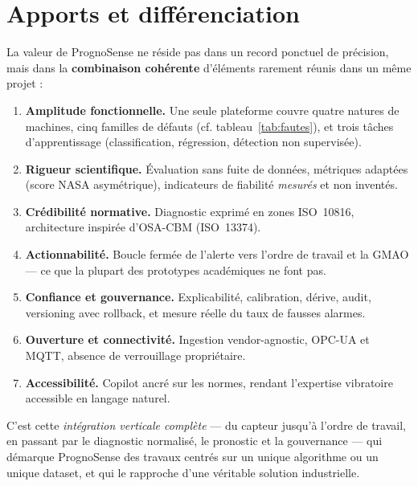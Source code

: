 \section{Apports et différenciation}
La valeur de PrognoSense ne réside pas dans un record ponctuel de précision, mais dans la
\textbf{combinaison cohérente} d'éléments rarement réunis dans un même projet :
\begin{enumerate}[leftmargin=1.6em]
  \item \textbf{Amplitude fonctionnelle.} Une seule plateforme couvre quatre natures de
        machines, cinq familles de défauts (cf. tableau~\ref{tab:fautes}), et trois tâches
        d'apprentissage (classification, régression, détection non supervisée).
  \item \textbf{Rigueur scientifique.} Évaluation sans fuite de données, métriques adaptées
        (score NASA asymétrique), indicateurs de fiabilité \emph{mesurés} et non inventés.
  \item \textbf{Crédibilité normative.} Diagnostic exprimé en zones ISO~10816, architecture
        inspirée d'OSA-CBM (ISO~13374).
  \item \textbf{Actionnabilité.} Boucle fermée de l'alerte vers l'ordre de travail et la
        GMAO --- ce que la plupart des prototypes académiques ne font pas.
  \item \textbf{Confiance et gouvernance.} Explicabilité, calibration, dérive, audit,
        versioning avec rollback, et mesure réelle du taux de fausses alarmes.
  \item \textbf{Ouverture et connectivité.} Ingestion vendor-agnostic, OPC-UA et MQTT,
        absence de verrouillage propriétaire.
  \item \textbf{Accessibilité.} Copilot ancré sur les normes, rendant l'expertise vibratoire
        accessible en langage naturel.
\end{enumerate}
C'est cette \emph{intégration verticale complète} --- du capteur jusqu'à l'ordre de travail,
en passant par le diagnostic normalisé, le pronostic et la gouvernance --- qui démarque
PrognoSense des travaux centrés sur un unique algorithme ou un unique dataset, et qui le
rapproche d'une véritable solution industrielle.
